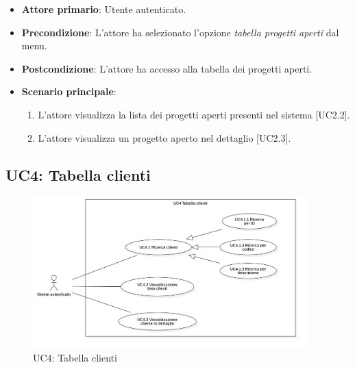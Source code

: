 \begin{itemize}
\item \textbf{Attore primario}: Utente autenticato.
\item \textbf{Precondizione}: L'attore ha selezionato l'opzione \textit{tabella progetti aperti} dal menu.
\item \textbf{Postcondizione}: L'attore ha accesso alla tabella dei progetti aperti.
\item \textbf{Scenario principale}: 
\begin{enumerate}
\item L'attore visualizza la lista dei progetti aperti presenti nel sistema [UC2.2].
\item L'attore visualizza un progetto aperto nel dettaglio [UC2.3].
\end{enumerate}
\end{itemize}

\pagebreak

\subsection{UC4: Tabella clienti}
\begin{figure}[!h]
\centering
\includegraphics[width=400px]{../images/UC/.jpeg/UC4.0-tabellaClienti.jpg}
\caption{UC4: Tabella clienti}
\end{figure}


